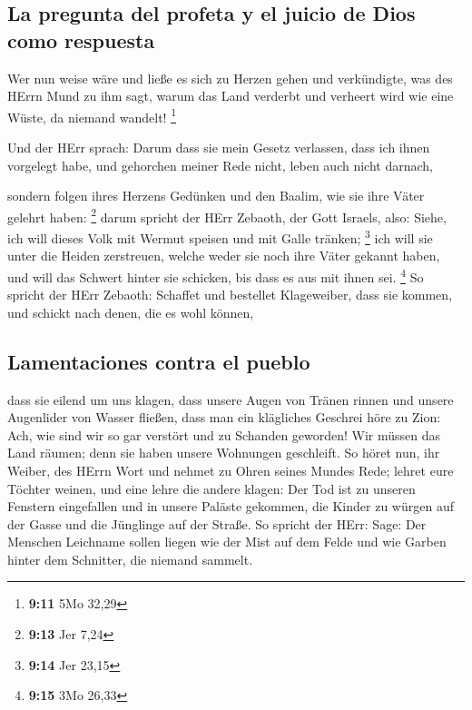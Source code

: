 \hypertarget{la-pregunta-del-profeta-y-el-juicio-de-dios-como-respuesta}{%
\subsection{La pregunta del profeta y el juicio de Dios como
respuesta}\label{la-pregunta-del-profeta-y-el-juicio-de-dios-como-respuesta}}

 Wer nun weise wäre und ließe es sich zu Herzen gehen und
verkündigte, was des HErrn Mund zu ihm sagt, warum das Land verderbt und
verheert wird wie eine Wüste, da niemand wandelt! \footnote{\textbf{9:11}
  5Mo 32,29}

 Und der HErr sprach: Darum dass sie mein Gesetz
verlassen, dass ich ihnen vorgelegt habe, und gehorchen meiner Rede
nicht, leben auch nicht darnach,

 sondern folgen ihres Herzens Gedünken und den Baalim,
wie sie ihre Väter gelehrt haben: \footnote{\textbf{9:13} Jer 7,24}
 darum spricht der HErr Zebaoth, der Gott Israels, also:
Siehe, ich will dieses Volk mit Wermut speisen und mit Galle tränken;
\footnote{\textbf{9:14} Jer 23,15}  ich will sie unter
die Heiden zerstreuen, welche weder sie noch ihre Väter gekannt haben,
und will das Schwert hinter sie schicken, bis dass es aus mit ihnen sei.
\footnote{\textbf{9:15} 3Mo 26,33}  So spricht der HErr
Zebaoth: Schaffet und bestellet Klageweiber, dass sie kommen, und
schickt nach denen, die es wohl können,

\hypertarget{lamentaciones-contra-el-pueblo}{%
\subsection{Lamentaciones contra el
pueblo}\label{lamentaciones-contra-el-pueblo}}

 dass sie eilend um uns klagen, dass unsere Augen von
Tränen rinnen und unsere Augenlider von Wasser fließen, 
dass man ein klägliches Geschrei höre zu Zion: Ach, wie sind wir so gar
verstört und zu Schanden geworden! Wir müssen das Land räumen; denn sie
haben unsere Wohnungen geschleift.  So höret nun, ihr
Weiber, des HErrn Wort und nehmet zu Ohren seines Mundes Rede; lehret
eure Töchter weinen, und eine lehre die andere klagen: 
Der Tod ist zu unseren Fenstern eingefallen und in unsere Paläste
gekommen, die Kinder zu würgen auf der Gasse und die Jünglinge auf der
Straße.  So spricht der HErr: Sage: Der Menschen
Leichname sollen liegen wie der Mist auf dem Felde und wie Garben hinter
dem Schnitter, die niemand sammelt.

